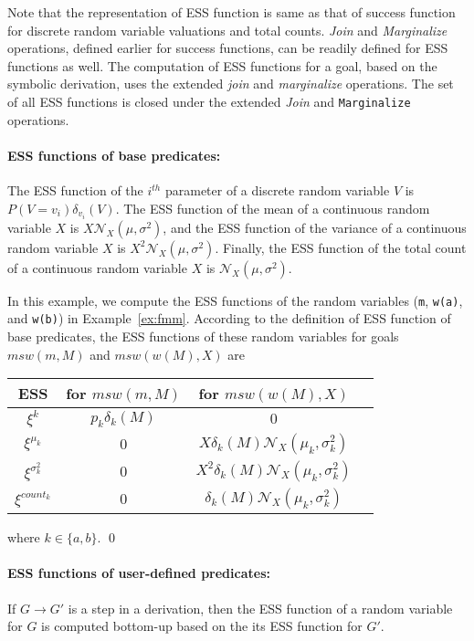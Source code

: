 Note that the representation of ESS function is same as that of
success function for discrete random variable valuations and total
counts. \emph{Join} and \emph{Marginalize} operations, defined earlier
for success functions, can be readily defined for ESS functions as
well.  The computation of ESS functions for a goal, based on the
symbolic derivation, uses the extended \emph{join} and
\emph{marginalize} operations.  The set of all ESS functions is closed
under the extended \emph{Join} and \texttt{Marginalize} operations. 


\paragraph{ESS functions of base predicates:}
The ESS function of the $i^{th}$ parameter of a discrete random variable $V$ is $P(V=v_i)\delta_{v_{i}}(V)$.
The ESS function of the mean of a continuous random variable $X$ is $X
\mathcal{N}_{X}(\mu, \sigma^{2})$, and the ESS function of the
variance of a continuous random variable $X$ is $X^{2}
\mathcal{N}_{X}(\mu, \sigma^{2})$. Finally, the ESS function of the
total count of a continuous random variable $X$ is
$\mathcal{N}_{X}(\mu, \sigma^{2})$. 

\begin{Ex}
In this example, we compute the ESS functions of the random variables (\texttt{m}, \texttt{w(a)}, and \texttt{w(b)}) in Example~\ref{ex:fmm}.
According to the definition of ESS function of base predicates, the ESS functions of these random variables for goals $msw(m, M)$ and  $msw(w(M), X)$ are
 \begin{center}
\begin{tabular}{|c|c|c|c|}
  \hline
  ESS & for $msw(m, M)$ & for $msw(w(M), X)$ \\ \hline
  $\xi^{k}$ & $p_{k} \delta_{k}(M)$ & $0$  \\ \hline
  $\xi^{\mu_{k}}$ & $0$ & $X \delta_{k}(M) \mathcal{N}_{X}(\mu_{k}, \sigma^{2}_{k})$  \\ \hline
  $\xi^{\sigma^{2}_{k}}$ & $0$ & $X^{2} \delta_{k}(M) \mathcal{N}_{X}(\mu_{k}, \sigma^{2}_{k})$  \\ \hline
  $\xi^{count_{k}}$ & $0$ & $\delta_{k}(M) \mathcal{N}_{X}(\mu_{k}, \sigma^{2}_{k})$  \\ \hline
\end{tabular}
\end{center}
where $k \in \{a,b\}$.
\qed
\end{Ex}


\paragraph{ESS functions of user-defined predicates:}
If $G \rightarrow G'$ is a step in a derivation, then the ESS 
function of a random variable for $G$ is computed bottom-up based on
the its ESS
function for $G'$. 

